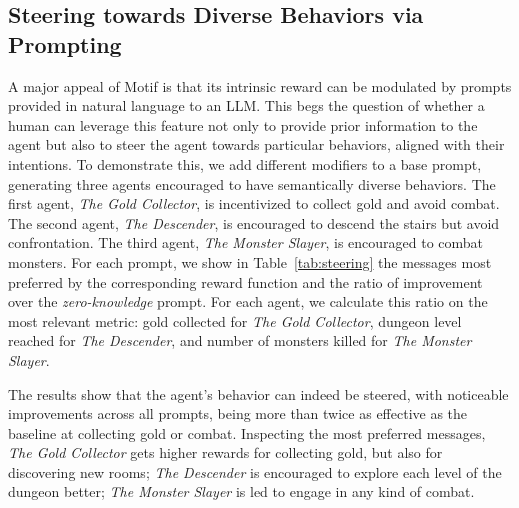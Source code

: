 \documentclass{article} %
\begin{document}
\subsection{Steering towards Diverse Behaviors via Prompting}
\label{sec:diversity}
A major appeal of Motif is that its intrinsic reward can be modulated by prompts provided in natural language to an LLM.
This begs the question of whether a human can leverage this feature not only to provide prior information to the agent but also to steer the agent towards particular behaviors, aligned with their intentions. To demonstrate this, we add different modifiers to a base prompt, generating three agents encouraged to have semantically diverse behaviors. The first agent, \textit{The Gold Collector}, is incentivized to collect gold and avoid combat. The second agent, \textit{The Descender}, is encouraged to descend the stairs but avoid confrontation. The third agent, \textit{The Monster Slayer}, is encouraged to combat monsters. 
For each prompt, we show in Table~\ref{tab:steering} the messages most preferred by the corresponding reward function and the ratio of improvement over the \textit{zero-knowledge} prompt. For each agent, we calculate this ratio on the most relevant metric: gold collected for \textit{The Gold Collector}, dungeon level reached for \textit{The Descender}, and number of monsters killed for \textit{The Monster Slayer}. 

The results show that the agent's behavior can indeed be steered, with noticeable improvements across all prompts, being more than twice as effective as the baseline at collecting gold or combat.
Inspecting the most preferred messages, \textit{The Gold Collector} gets higher rewards for collecting gold, but also for discovering new rooms; \textit{The Descender} is encouraged to explore each level of the dungeon better;
\textit{The Monster Slayer} is led to engage in any kind of combat.
\end{document}
